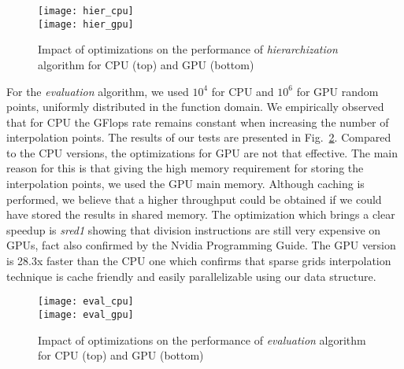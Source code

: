 \begin{figure}[h]
  \centering
  \texttt{[image: hier\_cpu]} \\
  \vspace{5pt}
  \texttt{[image: hier\_gpu]}
  \caption{Impact of optimizations on the performance of
  \textit{hierarchization} algorithm for CPU (top) and GPU (bottom)}
  \label{fig:hier_results}
\end{figure}

For the \textit{evaluation} algorithm, we used $10^{4}$ for CPU and $10^{6}$
for GPU random points, uniformly distributed in the function domain. We
empirically observed that for CPU the GFlops rate remains constant when
increasing the number of interpolation points. The results of our tests are
presented in Fig.~\ref{fig:eval_results}. Compared to the CPU versions, the
optimizations for GPU are not that effective. The main reason for this is that
giving the high memory requirement for storing the interpolation points, we used
the GPU main memory. Although caching is performed, we believe that a higher
throughput could be obtained if we could have stored the results in shared
memory. The optimization which brings a clear speedup is \textit{sred1} showing
that division instructions are still very expensive on GPUs, fact also confirmed
by the Nvidia Programming Guide. The GPU version is 28.3x faster than the CPU
one which confirms that sparse grids interpolation technique is cache friendly
and easily parallelizable using our data structure.

\begin{figure}[h]
  \centering
  \texttt{[image: eval\_cpu]} \\
  \vspace{5pt}
  \texttt{[image: eval\_gpu]}
  \caption{Impact of optimizations on the performance of \textit{evaluation}
  algorithm for CPU (top) and GPU (bottom)}
  \label{fig:eval_results}
\end{figure}

